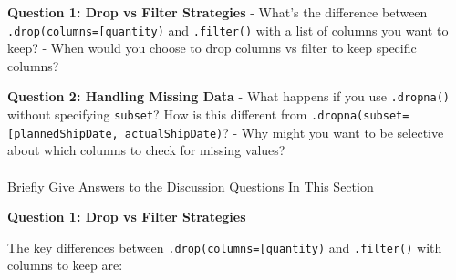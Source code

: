 \documentclass[
  letterpaper,
  DIV=11,
  numbers=noendperiod]{scrartcl}
\makeatletter
\let\oldparagraph\paragraph
\renewcommand{\paragraph}{
    \@ifstar
      \xxxParagraphStar
      \xxxParagraphNoStar
  }
\newcommand{\xxxParagraphStar}[1]{\oldparagraph*{#1}\mbox{}}
\newcommand{\xxxParagraphNoStar}[1]{\oldparagraph{#1}\mbox{}}
\makeatother
\begin{document}
\begin{tcolorbox}[enhanced jigsaw, bottomtitle=1mm, opacitybacktitle=0.6, toptitle=1mm, colbacktitle=quarto-callout-important-color!10!white, breakable, coltitle=black, bottomrule=.15mm, left=2mm, colframe=quarto-callout-important-color-frame, colback=white, title=\textcolor{quarto-callout-important-color}{\faExclamation}\hspace{0.5em}{🤔 Discussion Questions: Drop Mental Model}, leftrule=.75mm, arc=.35mm, rightrule=.15mm, opacityback=0, toprule=.15mm, titlerule=0mm]

\textbf{Question 1: Drop vs Filter Strategies} - What's the difference
between
\texttt{.drop(columns={[}\textquotesingle{}quantity\textquotesingle{}{]})}
and \texttt{.filter()} with a list of columns you want to keep? - When
would you choose to drop columns vs filter to keep specific columns?

\textbf{Question 2: Handling Missing Data} - What happens if you use
\texttt{.dropna()} without specifying \texttt{subset}? How is this
different from
\texttt{.dropna(subset={[}\textquotesingle{}plannedShipDate\textquotesingle{},\ \textquotesingle{}actualShipDate\textquotesingle{}{]})}?
- Why might you want to be selective about which columns to check for
missing values?

\end{tcolorbox}

\paragraph{Briefly Give Answers to the Discussion Questions In This
Section}\label{briefly-give-answers-to-the-discussion-questions-in-this-section-2}

\textbf{Question 1: Drop vs Filter Strategies}

The key differences between
\texttt{.drop(columns={[}\textquotesingle{}quantity\textquotesingle{}{]})}
and \texttt{.filter()} with columns to keep are:
\end{document}
